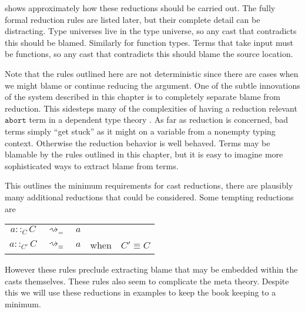  shows approximately how these reductions should be carried out.
The fully formal reduction rules are listed later, but their complete detail can be distracting.
Type universes live in the type universe, so any cast that contradicts this should be blamed.
Similarly for function types.
Terms that take input must be functions, so any cast that contradicts this should blame the source location.
 
Note that the rules outlined here are not deterministic since there are cases when we might blame or continue reducing the argument.
One of the subtle innovations of the system described in this chapter is to completely separate blame from reduction.
This sidesteps many of the complexities of having a reduction relevant $\mathtt{abort}$ term in a dependent type theory \cite{sjoberg2012irrelevance,pedrot2018failure}.
As far as reduction is concerned, bad terms simply ``get stuck'' as it might on a variable from a nonempty typing context.
Otherwise the reduction behavior is well behaved.
Terms may be blamable by the rules outlined in this chapter, but it is easy to imagine more sophisticated ways to extract blame from terms.
 
This outlines the minimum requirements for cast reductions, there are plausibly many additional reductions that could be considered.
Some tempting reductions are
 
\begin{tabular}{ccccc}
$a::_{C}C$ & $\rightsquigarrow_{=}$ & $a$ &  & \tabularnewline
$a::_{C'}C$ & $\rightsquigarrow_{\equiv}$ & $a$ & when & $C'\equiv C$\tabularnewline
\end{tabular}
 
However these rules preclude extracting blame that may be embedded within the casts themselves.
These rules also seem to complicate the meta theory.
Despite this we will use these reductions in examples to keep the book keeping to a minimum.
 
 





